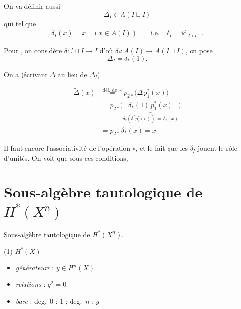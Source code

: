 \documentclass[11pt,a4paper]{article}
\begin{document}

On va définir aussi
\[
  \Delta_{I} \in A(I \sqcup I)
\]
qui  tel que
\[
  \widetilde{\delta}_{I}(x) = x \quad (x \in A(I)) \qquad \text{i.e.}\quad
  \widetilde{\delta}_{I} = \mathrm{id}_{A(I)} .
\]

Pour , on  considère
$\delta : I \sqcup I \to I$ d'où $\delta_{*} : A(I) \to A(I \sqcup I)$, on pose
\[
  \Delta_{I} = \delta_{*}(1) .
\]

On a (écrivant $\Delta$ au lieu de $\Delta_{I}$)


\begin{align*}
  \widetilde{\Delta}(x)
  &\overset{\text{déf.\ de }\sim}{=} p_{2*}\bigl(\Delta\, p_{1}^{*}(x)\bigr) \\
  &= p_{2*}\bigl(\underbrace{\delta_{*}(1)\, p_{1}^{*}(x)}_{\delta_{*}(\delta^{*} p_{1}^{*}(x)) \,=\, \delta_{*}(x)}\bigr) \\
  &= p_{2*}\, \delta_{*}(x) = x
\end{align*}

Il faut encore  l'associativité de l'opération $\circ$, et
le fait que les $\delta_{I}$ jouent le rôle d'unités. On voit que sous ces
conditions,

\section*{Sous-algèbre tautologique de $H^{*}(X^{n})$}


Sous-algèbre tautologique de $H^{*}(X^{n})$.

(1) $H^{*}(X)$ 

\begin{itemize}
  \item \emph{générateurs} : $y \in H^{n}(X)$
  \item \emph{relations} : $y^{2} = 0$
  \item \emph{base} : deg.\ $0$ : $1$ ; deg.\ $n$ : $y$
\end{itemize}
\end{document}
